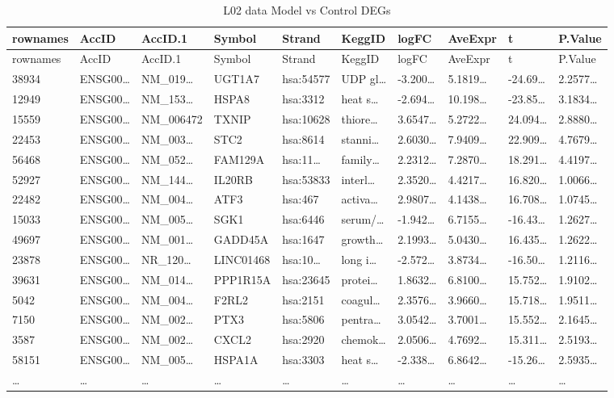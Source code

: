 \documentclass[
]{article}
\begin{document}
\begin{longtable}[]{@{}llllllllll@{}}
\caption{\label{tab:L02-data-Model-vs-Control-DEGs}L02 data Model vs Control DEGs}\tabularnewline
\toprule
rownames & AccID & AccID.1 & Symbol & Strand & KeggID & logFC & AveExpr & t & P.Value\tabularnewline
\midrule
\endfirsthead
\toprule
rownames & AccID & AccID.1 & Symbol & Strand & KeggID & logFC & AveExpr & t & P.Value\tabularnewline
\midrule
\endhead
38934 & ENSG00\ldots{} & NM\_019\ldots{} & UGT1A7 & hsa:54577 & UDP gl\ldots{} & -3.200\ldots{} & 5.1819\ldots{} & -24.69\ldots{} & 2.2577\ldots{}\tabularnewline
12949 & ENSG00\ldots{} & NM\_153\ldots{} & HSPA8 & hsa:3312 & heat s\ldots{} & -2.694\ldots{} & 10.198\ldots{} & -23.85\ldots{} & 3.1834\ldots{}\tabularnewline
15559 & ENSG00\ldots{} & NM\_006472 & TXNIP & hsa:10628 & thiore\ldots{} & 3.6547\ldots{} & 5.2722\ldots{} & 24.094\ldots{} & 2.8880\ldots{}\tabularnewline
22453 & ENSG00\ldots{} & NM\_003\ldots{} & STC2 & hsa:8614 & stanni\ldots{} & 2.6030\ldots{} & 7.9409\ldots{} & 22.909\ldots{} & 4.7679\ldots{}\tabularnewline
56468 & ENSG00\ldots{} & NM\_052\ldots{} & FAM129A & hsa:11\ldots{} & family\ldots{} & 2.2312\ldots{} & 7.2870\ldots{} & 18.291\ldots{} & 4.4197\ldots{}\tabularnewline
52927 & ENSG00\ldots{} & NM\_144\ldots{} & IL20RB & hsa:53833 & interl\ldots{} & 2.3520\ldots{} & 4.4217\ldots{} & 16.820\ldots{} & 1.0066\ldots{}\tabularnewline
22482 & ENSG00\ldots{} & NM\_004\ldots{} & ATF3 & hsa:467 & activa\ldots{} & 2.9807\ldots{} & 4.1438\ldots{} & 16.708\ldots{} & 1.0745\ldots{}\tabularnewline
15033 & ENSG00\ldots{} & NM\_005\ldots{} & SGK1 & hsa:6446 & serum/\ldots{} & -1.942\ldots{} & 6.7155\ldots{} & -16.43\ldots{} & 1.2627\ldots{}\tabularnewline
49697 & ENSG00\ldots{} & NM\_001\ldots{} & GADD45A & hsa:1647 & growth\ldots{} & 2.1993\ldots{} & 5.0430\ldots{} & 16.435\ldots{} & 1.2622\ldots{}\tabularnewline
23878 & ENSG00\ldots{} & NR\_120\ldots{} & LINC01468 & hsa:10\ldots{} & long i\ldots{} & -2.572\ldots{} & 3.8734\ldots{} & -16.50\ldots{} & 1.2116\ldots{}\tabularnewline
39631 & ENSG00\ldots{} & NM\_014\ldots{} & PPP1R15A & hsa:23645 & protei\ldots{} & 1.8632\ldots{} & 6.8100\ldots{} & 15.752\ldots{} & 1.9102\ldots{}\tabularnewline
5042 & ENSG00\ldots{} & NM\_004\ldots{} & F2RL2 & hsa:2151 & coagul\ldots{} & 2.3576\ldots{} & 3.9660\ldots{} & 15.718\ldots{} & 1.9511\ldots{}\tabularnewline
7150 & ENSG00\ldots{} & NM\_002\ldots{} & PTX3 & hsa:5806 & pentra\ldots{} & 3.0542\ldots{} & 3.7001\ldots{} & 15.552\ldots{} & 2.1645\ldots{}\tabularnewline
3587 & ENSG00\ldots{} & NM\_002\ldots{} & CXCL2 & hsa:2920 & chemok\ldots{} & 2.0506\ldots{} & 4.7692\ldots{} & 15.311\ldots{} & 2.5193\ldots{}\tabularnewline
58151 & ENSG00\ldots{} & NM\_005\ldots{} & HSPA1A & hsa:3303 & heat s\ldots{} & -2.338\ldots{} & 6.8642\ldots{} & -15.26\ldots{} & 2.5935\ldots{}\tabularnewline
\ldots{} & \ldots{} & \ldots{} & \ldots{} & \ldots{} & \ldots{} & \ldots{} & \ldots{} & \ldots{} & \ldots{}\tabularnewline
\bottomrule
\end{longtable}
\end{document}
